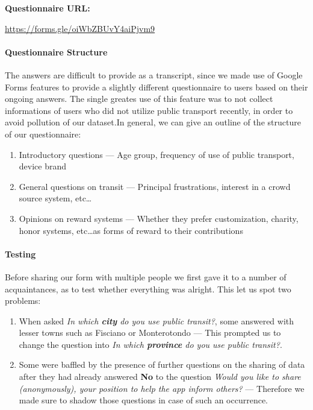 \documentclass[a4paper, 11pt]{report}
\newenvironment{inlinebox}[1][]{%
  \titlebox%
  {\upshape\bfseries #1}%
}{%
  \endbasecolorbox%
}
\begin{document}
\begin{center}
	\begin{inlinebox}[Questionnaire URL:]
		\centering
		\url{https://forms.gle/oiWbZBUvY4aiPjvm9}
	\end{inlinebox}
\end{center}
\paragraph{Questionnaire Structure}

The answers are difficult to provide as a transcript, since we made use of Google Forms
features to provide a slightly different questionnaire to users based on their ongoing answers.
The single greates use of this feature was to not collect informations of users who did not
utilize public transport recently, in order to avoid pollution of our dataset.\@ In
general, we can give an outline of the structure of our questionnaire:

\begin{enumerate}
	\item Introductory questions --- Age group, frequency of use of public transport, device brand
	\item General questions on transit --- Principal frustrations, interest in a crowd source system, etc\dots
	\item Opinions on reward systems --- Whether they prefer customization, charity, honor systems, etc\dots\@ as
	      forms of reward to their contributions
\end{enumerate}

\paragraph{Testing}
Before sharing our form with multiple people we first gave it to a number of acquaintances,
as to test whether everything was alright. This let us spot two problems:
\begin{enumerate}
	\item When asked \emph{In which \textbf{city} do you use public transit?}, some answered
	      with lesser towns such as Fisciano or Monterotondo --- This prompted us to change the
	      question into \emph{In which \textbf{province} do you use public transit?}.
	\item Some were baffled by the presence of further questions on the sharing of data after
	      they had already answered \textbf{No} to the question \emph{Would you like to share
		      (anonymously), your position to help the app inform others?} --- Therefore we made sure to
	      shadow those questions in case of such an occurrence.
\end{enumerate}
\end{document}
